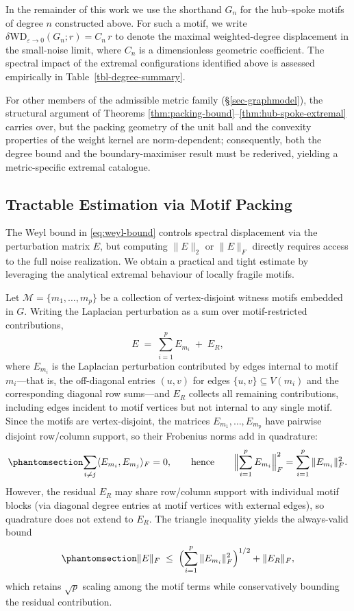 \documentclass[
  11pt,
  letterpaper]{siamart251216}
\begin{document}
In the remainder of this work we use the shorthand \(G_n\) for the
hub--spoke motifs of degree \(n\) constructed above. For such a motif,
we write \(\delta \mathrm{WD}_{\varepsilon \to 0}(G_n; r) = C_n\, r\) to
denote the maximal weighted-degree displacement in the small-noise
limit, where \(C_n\) is a dimensionless geometric coefficient. The
spectral impact of the extremal configurations identified above is
assessed empirically in Table~\ref{tbl-degree-summary}.

For other members of the admissible metric family
(§\ref{sec-graphmodel}), the structural argument of Theorems
\ref{thm:packing-bound}--\ref{thm:hub-spoke-extremal} carries over, but
the packing geometry of the unit ball and the convexity properties of
the weight kernel are norm-dependent; consequently, both the degree
bound and the boundary-maximiser result must be rederived, yielding a
metric-specific extremal catalogue.

\subsection{Tractable Estimation via Motif
Packing}\label{sec-motif-packing}

The Weyl bound in \eqref{eq:weyl-bound} controls spectral displacement
via the perturbation matrix \(E\), but computing \(\|E\|_2\) or
\(\|E\|_F\) directly requires access to the full noise realization. We
obtain a practical and tight estimate by leveraging the analytical
extremal behaviour of locally fragile motifs.

Let \(\mathcal{M} = \{m_1,\dots,m_p\}\) be a collection of
vertex-disjoint witness motifs embedded in \(G\). Writing the Laplacian
perturbation as a sum over motif-restricted contributions, \[
E \;=\; \sum_{i=1}^{p} E_{m_i} \;+\; E_R,
\] where \(E_{m_i}\) is the Laplacian perturbation contributed by edges
internal to motif \(m_i\)---that is, the off-diagonal entries \((u,v)\)
for edges \(\{u,v\} \subseteq V(m_i)\) and the corresponding diagonal
row sums---and \(E_R\) collects all remaining contributions, including
edges incident to motif vertices but not internal to any single motif.
Since the motifs are vertex-disjoint, the matrices
\(E_{m_1},\dots,E_{m_p}\) have pairwise disjoint row/column support, so
their Frobenius norms add in quadrature:
\begin{equation}\phantomsection\label{eq-frob-quadrature}{
\sum_{i \neq j} \langle E_{m_i}, E_{m_j} \rangle_F = 0,
\qquad\text{hence}\qquad
\Bigl\|\sum_{i=1}^{p} E_{m_i}\Bigr\|_F^2 = \sum_{i=1}^{p} \|E_{m_i}\|_F^2.
}\end{equation} However, the residual \(E_R\) may share row/column
support with individual motif blocks (via diagonal degree entries at
motif vertices with external edges), so quadrature does not extend to
\(E_R\). The triangle inequality yields the always-valid bound
\begin{equation}\phantomsection\label{eq-frob-mixed}{
\|E\|_F \;\le\; \Bigl(\sum_{i=1}^{p} \|E_{m_i}\|_F^2\Bigr)^{1/2} + \|E_R\|_F,
}\end{equation} which retains \(\sqrt{p}\) scaling among the motif terms
while conservatively bounding the residual contribution.
\end{document}
